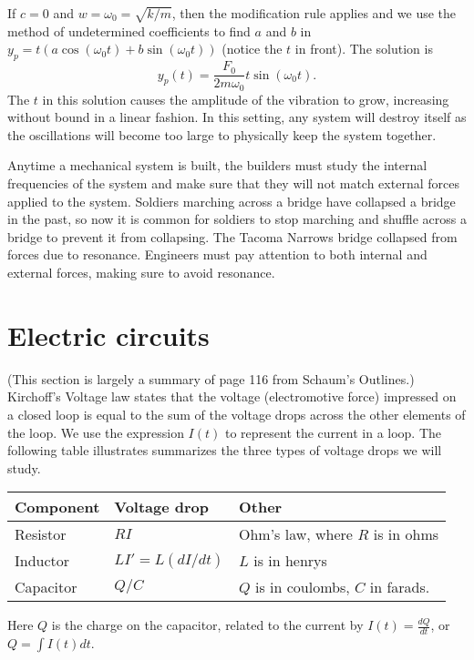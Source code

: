 \begin{observation}
If $c=0$ and $w=\omega_0 = \sqrt{k/m}$, then the modification rule applies and we use the method of undetermined coefficients to find $a$ and $b$ in $y_p=t(a\cos(\omega_0 t)+b\sin(\omega_0 t))$ (notice the $t$ in front). The solution is 
$$y_p(t) = \frac{F_0}{2m\omega_0}t\sin(\omega_0 t).$$ The $t$ in this solution causes the amplitude of the vibration to grow,  increasing without bound in a linear fashion. In this setting, any system will destroy itself as the oscillations will become too large to physically keep the system together. 

Anytime a mechanical system is built, the builders must study the internal frequencies of the system and make sure that they will not match external forces applied to the system. Soldiers marching across a bridge have collapsed a bridge in the past, so now it is common for soldiers to stop marching and shuffle across a bridge to prevent it from collapsing. The Tacoma Narrows bridge collapsed from forces due to resonance. Engineers must pay attention to both internal and external forces, making sure to avoid resonance.  
\end{observation}

\section{Electric circuits} (This section is largely a summary of page 116 from Schaum's Outlines.)
Kirchoff's Voltage law states that the voltage (electromotive force) impressed on a closed loop is equal to the sum of the voltage drops across the other elements of the loop. We use the expression $I(t)$ to represent the current in a loop. The following table illustrates summarizes the three types of voltage drops we will study.
\begin{center}
\begin{tabular}{|l|l|l|}
\hline
Component & Voltage drop & Other\\\hline
Resistor & $RI$ & Ohm's law, where $R$ is in ohms\\\hline
Inductor & $LI' = L(dI/dt)$ & $L$ is in henrys\\\hline
Capacitor& $Q/C$ & $Q$ is in coulombs, $C$ in farads.\\\hline
\end{tabular}
\end{center}
Here $Q$ is the charge on the capacitor, related to the current by $I(t)=\frac{dQ}{dt}$, or $Q=\int I(t) dt$.



